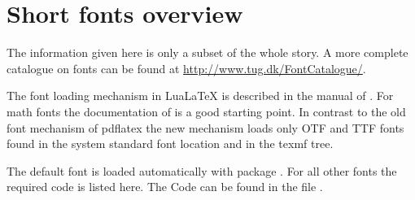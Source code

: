 \chapter{Short fonts overview}
\label{chap:doc:fonts}

The information given here is only a subset of the whole story. A more complete catalogue on \latex fonts can be found at \href{http://www.tug.dk/FontCatalogue/}{http://www.tug.dk/FontCatalogue/}.

The font loading mechanism in LuaLaTeX is described in the manual of . For math fonts the documentation of  is a good starting point. In contrast to the old font mechanism of pdflatex the new mechanism loads only OTF and TTF fonts found in the system standard font location and in the texmf tree.

The default font  is loaded automatically with package .
For all other fonts the required code is listed here. The Code can be found in the file .

